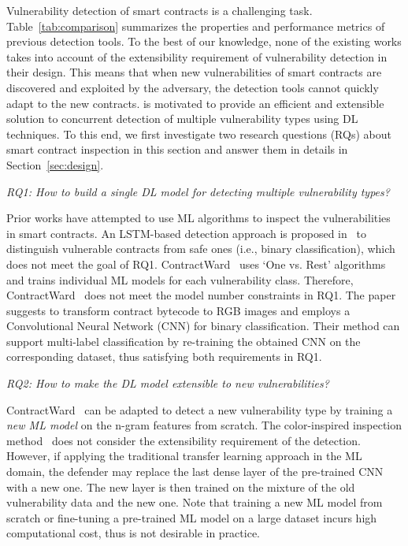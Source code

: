 Vulnerability detection of smart contracts is a challenging task.  
Table~\ref{tab:comparison} summarizes the properties and performance metrics of previous detection tools. 
To the best of our knowledge, none of the existing works takes into account of the extensibility requirement of vulnerability detection in their design. This means that when new vulnerabilities of smart contracts are discovered and exploited by the adversary, the detection tools cannot quickly adapt to the new contracts. 
\sys{} is motivated to provide an efficient and extensible solution to concurrent detection of multiple vulnerability types using DL techniques.
To this end, we first investigate two research questions (RQs) about smart contract inspection in this section and answer them in details in Section~\ref{sec:design}. 

\vspace{0.2em}
\textit{RQ1: How to build a single DL model for detecting multiple vulnerability types?}

Prior works have attempted to use ML algorithms to inspect the vulnerabilities in smart contracts.  
An LSTM-based detection approach is proposed in~\cite{rw_lstm} to distinguish vulnerable contracts from safe ones (i.e., binary classification), which does not meet the goal of RQ1. 
ContractWard~\cite{rw_contractward} uses `One vs. Rest' algorithms and trains individual ML models for each vulnerability class. 
Therefore, ContractWard~\cite{rw_contractward} does not meet the model number constraints in RQ1.  
The paper~\cite{huang2018hunting} suggests to transform contract bytecode to RGB images and employs a Convolutional Neural Network (CNN) for binary classification.
Their method can support multi-label classification by re-training the obtained CNN on the corresponding dataset, thus satisfying both requirements in RQ1.    

\vspace{0.3em}
\textit{RQ2: How to make the DL model extensible to new vulnerabilities?}

ContractWard~\cite{rw_contractward} can be adapted to detect a new vulnerability type by training a \textit{new ML model} on the n-gram features from scratch.
The color-inspired inspection method~\cite{huang2018hunting} does not consider the extensibility requirement of the detection. 
However, if applying the traditional transfer learning approach in the ML domain, the defender may replace the last dense layer of the pre-trained CNN with a new one. The new layer is then trained on the mixture of the old vulnerability data and the new one.  
Note that training a new ML model from scratch or fine-tuning a pre-trained ML model on a large dataset incurs high computational cost, thus is not desirable in practice. 

